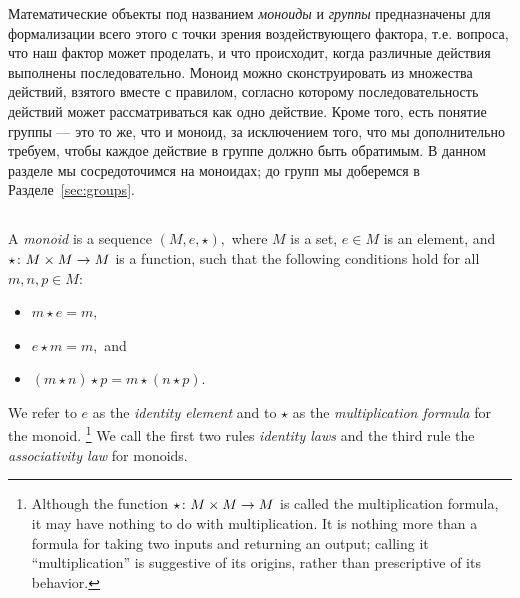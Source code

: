 \documentclass[CT4S-EN-RU]{subfiles}
\begin{document}
\begin{blockRUS}
Математические объекты под названием {\em моноиды} и {\em группы} предназначены для формализации всего этого с точки зрения воздействующего фактора, т.е. вопроса, что наш фактор может проделать, и что происходит, когда различные действия выполнены последовательно. Моноид можно сконструировать из множества действий, взятого вместе с правилом, согласно которому последовательность действий может рассматриваться как одно действие. Кроме того, есть понятие группы — это то же, что и моноид, за исключением того, что мы дополнительно требуем, чтобы каждое действие в группе должно быть обратимым. В данном разделе мы сосредоточимся на моноидах; до групп мы доберемся в Разделе~\ref{sec:groups}.
\end{blockRUS}


\subsection{}

\begin{definitionENG}[Monoid]\label{def:monoid}
A {\em monoid} is a sequence $(M,e,\star),$ where $M$ is a set, $e\in M$ is an element, and $\star\colon M\times M\rightarrow M$ is a function, such that the following conditions hold for all $m,n,p\in M$:
\begin{itemize}
\item $m\star e=m,$
\item $e\star m=m,$ and
\item $(m\star n)\star p=m\star(n\star p).$
\end{itemize}
We refer to $e$ as the {\em identity element} and to $\star$ as the {\em multiplication formula} for the monoid.%
\footnote{Although the function $\star\colon M\times M\rightarrow M$ is called the multiplication formula, it may have nothing to do with multiplication. It is nothing more than a formula for taking two inputs and returning an output; calling it “multiplication” is suggestive of its origins, rather than prescriptive of its behavior.}
We call the first two rules {\em identity laws} and the third rule the {\em associativity law} for monoids.
\end{definitionENG}
\end{document}
